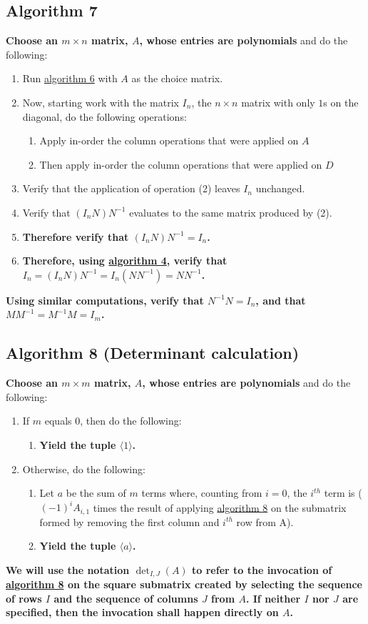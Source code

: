\documentclass[twocolumn]{article}
\begin{document}
		\subsection{Algorithm 7}\label{sec:algorithm 7}
			\textbf{Choose an $m\times n$ matrix, $A$, whose entries are polynomials} and do the following:
			\begin{enumerate}
				\item Run \hyperref[sec:algorithm 6]{algorithm 6} with $A$ as the choice matrix.
				\item Now, starting work with the matrix $I_n$, the $n\times n$ matrix with only $1$s on the diagonal, do the following operations:
					\begin{enumerate}
						\item Apply in-order the column operations that were applied on $A$
						\item Then apply in-order the column operations that were applied on $D$
					\end{enumerate}
				\item Verify that the application of operation (2) leaves $I_n$ unchanged.
				\item Verify that $(I_nN)N^{-1}$ evaluates to the same matrix produced by (2).
				\item \textbf{Therefore verify that $(I_nN)N^{-1}=I_n$.}
				\item \textbf{Therefore, using \hyperref[sec:algorithm 4]{algorithm 4}, verify that $I_n=(I_nN)N^{-1}=I_n(NN^{-1})=NN^{-1}$.}
			\end{enumerate}
			\textbf{Using similar computations, verify that $N^{-1}N=I_n$, and that $MM^{-1}=M^{-1}M=I_m$.}
		\subsection{Algorithm 8 (Determinant calculation)}\label{sec:algorithm 8}
			\textbf{Choose an $m\times m$ matrix, $A$, whose entries are polynomials} and do the following:
			\begin{enumerate}
				\item If $m$ equals $0$, then do the following:
				\begin{enumerate}
					\item \textbf{Yield the tuple $\langle 1\rangle$.}
				\end{enumerate}
				\item Otherwise, do the following:
				\begin{enumerate}
					\item Let $a$ be the sum of $m$ terms where, counting from $i=0$, the $i^{th}$ term is ($(-1)^{i}A_{i,1}$ times the result of applying \hyperref[sec:algorithm 8]{algorithm 8} on the submatrix formed by removing the first column and $i^{th}$ row from A).
					\item \textbf{Yield the tuple $\langle a\rangle$.}
				\end{enumerate}
			\end{enumerate}
			\textbf{We will use the notation $\det_{I,J}(A)$ to refer to the invocation of \hyperref[sec:algorithm 8]{algorithm 8} on the square submatrix created by selecting the sequence of rows $I$ and the sequence of columns $J$ from $A$. If neither $I$ nor $J$ are specified, then the invocation shall happen directly on $A$.}
\end{document}
